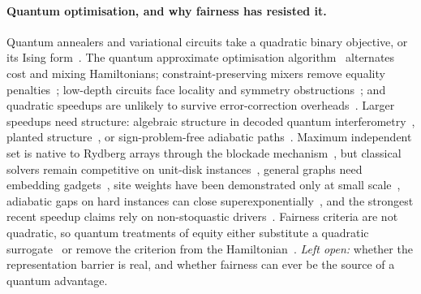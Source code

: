 \documentclass[11pt,a4paper]{article}
\begin{document}
\paragraph{Quantum optimisation, and why fairness has resisted it.}
Quantum annealers and variational circuits take a quadratic binary objective, or its Ising
form~\cite{lucas2014ising,kadowaki1998quantum}. The quantum approximate optimisation
algorithm~\cite{farhi2014quantum} alternates cost and mixing Hamiltonians; constraint-preserving
mixers remove equality penalties~\cite{hadfield2019quantum,wang2020xy}; low-depth circuits face
locality and symmetry obstructions~\cite{farhi2020quantum,bravyi2020obstacles}; and quadratic
speedups are unlikely to survive error-correction overheads~\cite{babbush2021focus}. Larger speedups
need structure: algebraic structure in decoded quantum
interferometry~\cite{jordan2025optimization,anschuetz2025decoded}, planted
structure~\cite{schmidhuber2025quartic}, or sign-problem-free adiabatic
paths~\cite{gilyen2021subexponential,hastings2021power}. Maximum independent set is native to Rydberg
arrays through the blockade
mechanism~\cite{jaksch2000fast,lukin2001dipole,pichler2018quantum,bernien2017probing,ebadi2022quantum},
but classical solvers remain competitive on unit-disk instances~\cite{andrist2023hardness}, general
graphs need embedding gadgets~\cite{nguyen2023quantum}, site weights have been demonstrated only at
small scale~\cite{deoliveira2025demonstration}, adiabatic gaps on hard instances can close
superexponentially~\cite{schiffer2024circumventing}, and the strongest recent speedup claims rely
on non-stoquastic drivers~\cite{choi2026exponential}. Fairness criteria are not quadratic, so quantum
treatments of equity either substitute a quadratic surrogate~\cite{udekwe2025qrestore} or remove the
criterion from the Hamiltonian~\cite{bach2026learning}. \emph{Left open:} whether the representation
barrier is real, and whether fairness can ever be the source of a quantum advantage.
\end{document}
